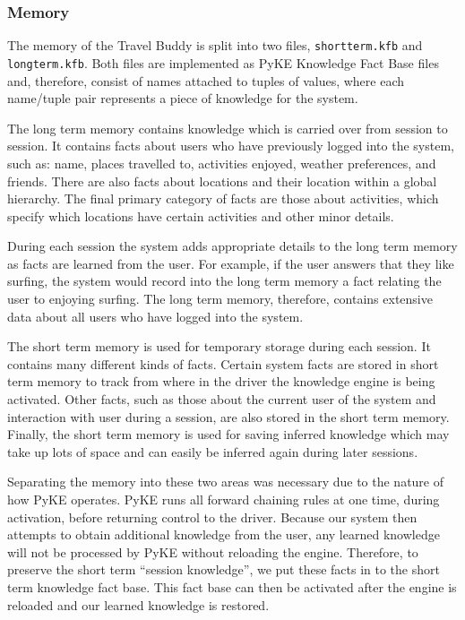 \documentclass[11pt]{article} %
\begin{document}
\subsubsection{Memory}
The memory of the Travel Buddy is split into two files, \texttt{shortterm.kfb} and \texttt{longterm.kfb}. Both files are implemented as PyKE Knowledge Fact Base files and, therefore, consist of names attached to tuples of values, where each name/tuple pair represents a piece of knowledge for the system.

The long term memory contains knowledge which is carried over from session to session. It contains facts about users who have previously logged into the system, such as: name, places travelled to, activities enjoyed, weather preferences, and friends. There are also facts about locations and their location within a global hierarchy. The final primary category of facts are those about activities, which specify which locations have certain activities and other minor details.

During each session the system adds appropriate details to the long term memory as facts are learned from the user. For example, if the user answers that they like surfing, the system would record into the long term memory a fact relating the user to enjoying surfing. The long term memory, therefore, contains extensive data about all users who have logged into the system.

The short term memory is used for temporary storage during each session. It contains many different kinds of facts. Certain system facts are stored in short term memory to track from where in the driver the knowledge engine is being activated. Other facts, such as those about the current user of the system and interaction with user during a session, are also stored in the short term memory. Finally, the short term memory is used for saving inferred knowledge which may take up lots of space and can easily be inferred again during later sessions.

Separating the memory into these two areas was necessary due to the nature of how PyKE operates. PyKE runs all forward chaining rules at one time, during activation, before returning control to the driver. Because our system then attempts to obtain additional knowledge from the user, any learned knowledge will not be processed by PyKE without reloading the engine. Therefore, to preserve the short term ``session knowledge'', we put these facts in to the short term knowledge fact base. This fact base can then be activated after the engine is reloaded and our learned knowledge is restored.
\end{document}
